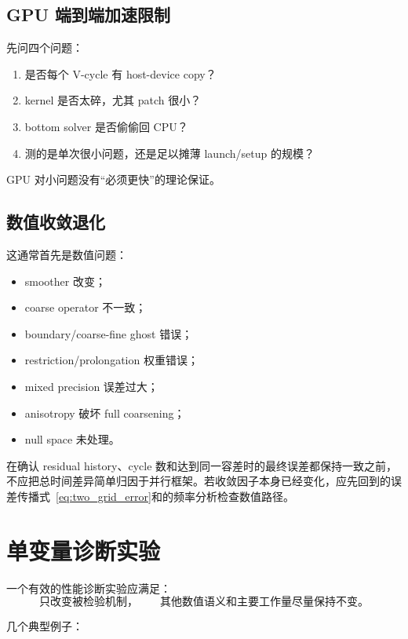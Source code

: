 \subsection{GPU 端到端加速限制}

先问四个问题：
\begin{enumerate}
\item 是否每个 V-cycle 有 host-device copy？
\item kernel 是否太碎，尤其 patch 很小？
\item bottom solver 是否偷偷回 CPU？
\item 测的是单次很小问题，还是足以摊薄 launch/setup 的规模？
\end{enumerate}
GPU 对小问题没有“必须更快”的理论保证。

\subsection{数值收敛退化}

这通常首先是数值问题：
\begin{itemize}
\item smoother 改变；
\item coarse operator 不一致；
\item boundary/coarse-fine ghost 错误；
\item restriction/prolongation 权重错误；
\item mixed precision 误差过大；
\item anisotropy 破坏 full coarsening；
\item null space 未处理。
\end{itemize}
在确认 residual history、cycle 数和达到同一容差时的最终误差都保持一致之前，不应把总时间差异简单归因于并行框架。若收敛因子本身已经变化，应先回到的误差传播式~\eqref{eq:two_grid_error}和的频率分析检查数值路径。

\section{单变量诊断实验}

一个有效的性能诊断实验应满足：
\begin{equation}
\boxed{
\text{只改变被检验机制，}
\qquad
\text{其他数值语义和主要工作量尽量保持不变。}
}
\label{eq:diagnosis-single-variable}
\end{equation}

几个典型例子：

